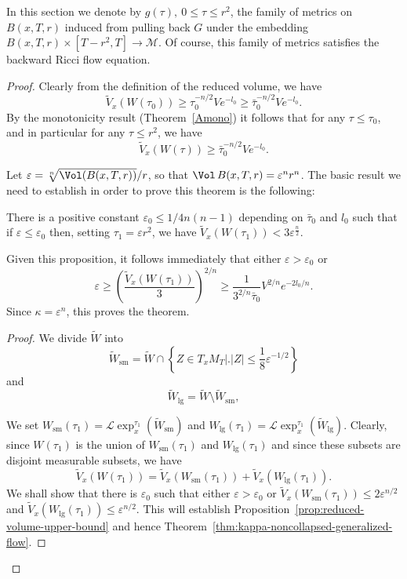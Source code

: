 In this section we denote by $g(\tau), \ 0\le \tau\le r^2$, the
family of metrics on $B(x,T,r)$ induced from pulling back $G$ under
the embedding $B(x,T,r)\times [T-r^2,T]\to {\mathcal M}$. Of course,
this family of metrics satisfies the backward Ricci flow equation.

\begin{proof}
Clearly from the definition of the reduced volume, we have
$$\widetilde V_x(W(\tau_0))\ge \tau_0^{-n/2}Ve^{-l_0}\ge
\bar\tau_0^{-n/2}Ve^{-l_0}.$$ By the
monotonicity result (Theorem~\ref{Amono}) it follows that for any
$\tau\le \tau_0$, and in particular for any $\tau\le r^2$, we have
\begin{equation}\label{redvoleqn} \widetilde V_x(W(\tau))\ge
\bar\tau_0^{-n/2}Ve^{-l_0}.\end{equation}

Let $\varepsilon=\sqrt[n]{\Vol(B(x,T,r))}/r$, so that $\Vol\,B(x,T,r)=\varepsilon^nr^n$.  The basic result we need to
establish in order to prove this theorem is the following:


\begin{proposition}\label{prop:reduced-volume-upper-bound}
\label{step}
There is a positive constant
$\varepsilon_0\le 1/4n(n-1)$ depending on $\bar\tau_0$ and $l_0$
such that if $\varepsilon\le \varepsilon_0$ then, setting
$\tau_1=\varepsilon r^2$, we have
 $\widetilde V_x(W(\tau_1)) < 3\varepsilon^{\frac{n}{2}}$.
\end{proposition}

Given this proposition, it follows immediately that either
$\varepsilon>\varepsilon_0$ or
$$\varepsilon\ge \left(\frac{\widetilde V_x(W(\tau_1))}{3}\right)^{2/n}\ge
\frac{1}{3^{2/n}\bar\tau_0}V^{2/n}e^{-2l_0/n}.$$ Since
$\kappa=\varepsilon^n$, this proves the theorem.

\begin{proof}  We divide $\widetilde W$
into
$$\widetilde W_{\mathrm{sm}}=\widetilde W\cap \left\{Z\in
T_xM_T\bigl|\bigr. |Z|\le \frac{1}{8}\varepsilon^{-1/2}\right\}$$
and
$$\widetilde W_{\mathrm{lg}}=\widetilde W\setminus \widetilde W_{\mathrm{sm}},$$

We set $W_{\mathrm{sm}}(\tau_1)={\mathcal L}\operatorname{exp}_x^{\tau_1}(\widetilde W_{\mathrm{sm}})$ and $W_{\mathrm{lg}}(\tau_1)={\mathcal L}\operatorname{exp}_x^{\tau_1}(\widetilde W_{\mathrm{lg}}).$ Clearly, since $W(\tau_1)$ is the union of $W_{\mathrm{sm}}(\tau_1)$ and $W_{\mathrm{lg}}(\tau_1)$ and since these subsets are
disjoint measurable subsets, we have
$$\widetilde V_x(W(\tau_1))=\widetilde V_x(W_{\mathrm{sm}}(\tau_1))+\widetilde V_x(W_{\mathrm{lg}}(\tau_1)).$$  We shall show that there is $\varepsilon_0$ such that either
$\varepsilon>\varepsilon_0$ or  $\widetilde V_x(W_{\mathrm{sm}}(\tau_1))\le
2\varepsilon^{n/2}$ and $\widetilde V_x(W_{\mathrm{lg}}(\tau_1))\le
\varepsilon^{n/2}$. This will establish Proposition~\ref{prop:reduced-volume-upper-bound} and hence
Theorem~\ref{thm:kappa-noncollapsed-generalized-flow}.


\end{proof}
\end{proof}
